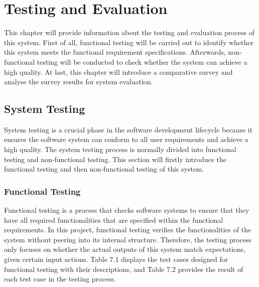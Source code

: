 
\chapter{Testing and Evaluation} \label{Chapter:Testing and Evaluation}

This chapter will provide information about the testing and evaluation process of this system. First of all, functional testing will be carried out to identify whether this system meets the functional requirement specifications. Afterwards, non-functional testing will be conducted to check whether the system can achieve a high quality. At last, this chapter will introduce a comparative survey and analyse the survey results for system evaluation.



\section{System Testing}

System testing is a crucial phase in the software development lifecycle because it ensures the software system can conform to all user requirements and achieve a high quality. The system testing process is normally divided into functional testing and non-functional testing. This section will firstly introduce the functional testing and then non-functional testing of this system. 

\subsection{Functional Testing}
Functional testing is a process that checks software systems to ensure that they have all required functionalities that are specified within the functional requirements. In this project, functional testing verifies the functionalities of the system without peering into its internal structure. Therefore, the testing process only focuses on whether the actual outputs of this system match expectations, given certain input actions. Table 7.1 displays the test cases designed for functional testing with their descriptions, and Table 7.2 provides the result of each test case in the testing process.


